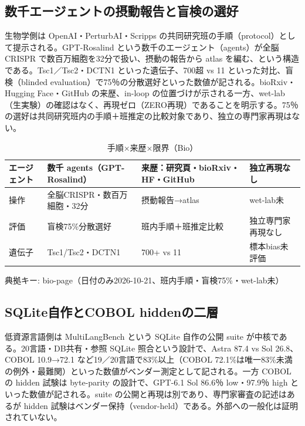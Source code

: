 \documentclass[lualatex,a4paper,10pt]{jlreq}
\begin{document}
\subsection*{数千エージェントの摂動報告と盲検の選好}


生物学側は OpenAI・PerturbAI・Scripps の共同研究班の手順（protocol）として提示される。GPT-Rosalind という数千のエージェント（agents）が全脳 CRISPR で数百万細胞を32分で扱い、摂動の報告から atlas を編む、という構造である。Tsc1／Tsc2・DCTN1 といった遺伝子、700超 vs 11 といった対比、盲検（blinded evaluation）で75％の分散選好といった数値が記される。bioRxiv・Hugging Face・GitHub の来歴、in-loop の位置づけが示される一方、wet-lab（生実験）の確認はなく、再現ゼロ（ZERO再現）であることを明示する。75％の選好は共同研究班内の手順＋班推定の比較対象であり、独立の専門家再現はない。


\begin{table}[htbp]\centering\footnotesize
\caption{手順×来歴×限界（Bio）}
\begin{tabularx}{0.96\linewidth}{@{}lXXX@{}}
\toprule
エージェント & 数千 agents（GPT-Rosalind） & 来歴：研究頁・bioRxiv・HF・GitHub & 独立再現なし \\
\midrule
操作 & 全脳CRISPR・数百万細胞・32分 & 摂動報告→atlas & wet-lab未 \\
評価 & 盲検75\%分散選好 & 班内手順＋班推定比較 & 独立専門家再現なし \\
遺伝子 & Tsc1/Tsc2・DCTN1 & 700+ vs 11 & 標本bias未評価 \\
\bottomrule
\end{tabularx}
{\scriptsize\color{SurveyMuted} 典拠キー: bio-page（日付のみ2026-10-21、班内手順・盲検75\%・wet-lab未）\par}
\end{table}


\subsection*{SQLite自作とCOBOL hiddenの二層}


低資源言語側は MultiLangBench という SQLite 自作の公開 suite が中核である。20言語・DB共有・参照 SQLite 照合という設計で、Astra 87.4 vs Sol 26.8、COBOL 10.9→72.1 など19／20言語で83\%以上（COBOL 72.1\%は唯一83\%未満の例外・最難関）といった数値がベンダー測定として記される。一方 COBOL の hidden 試験は byte-parity の設計で、GPT-6.1 Sol 86.6％ low・97.9％ high といった数値が記される。suite の公開と再現は別であり、専門家審査の記述はあるが hidden 試験はベンダー保持（vendor-held）である。外部への一般化は証明されていない。
\end{document}
